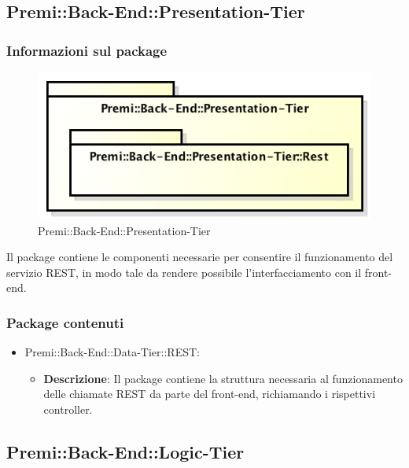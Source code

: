 \newpage

\subsection{Premi::Back-End::Presentation-Tier}
	\subsubsection*{Informazioni sul package}
		\begin{figure}[h]
			\centering
			\includegraphics[width=0.5\linewidth]{img/back-end_presentation-tier}
			\caption[Premi::Back-End::Presentation-Tier]{Premi::Back-End::Presentation-Tier}
		\end{figure}
		Il package contiene le componenti necessarie per consentire il funzionamento del servizio REST, in modo tale da rendere possibile l'interfacciamento con il front-end.
		
	\subsubsection*{Package contenuti}
		\begin{itemize}
			\item Premi::Back-End::Data-Tier::REST:
			\begin{itemize}
				\item \textbf{Descrizione}: Il package contiene la struttura necessaria al funzionamento delle chiamate REST da parte del front-end, richiamando i rispettivi controller.
			\end{itemize}
		\end{itemize}
		
\newpage
		
\subsection{Premi::Back-End::Logic-Tier}
